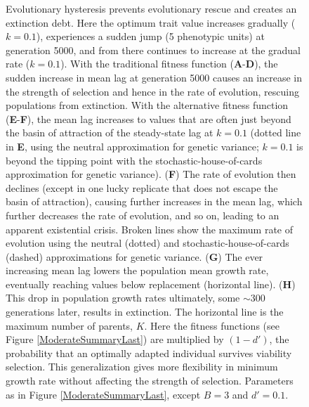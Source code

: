 \documentclass[12pt,letterpaper]{article} %
\begin{document}
\begin{figure}[!ht]
\centering
\caption{
Evolutionary hysteresis prevents evolutionary rescue and creates an extinction debt.
Here the optimum trait value increases gradually ($k=0.1$), experiences a sudden jump (5 phenotypic units) at generation 5000, and from there continues to increase at the gradual rate ($k=0.1$).  
With the traditional fitness function (\textbf{A}-\textbf{D}), the sudden increase in mean lag at generation 5000 causes an increase in the strength of selection and hence in the rate of evolution, rescuing populations from extinction.
With the alternative fitness function (\textbf{E}-\textbf{F}), the mean lag increases to values that are often just beyond the basin of attraction of the steady-state lag at $k=0.1$ (dotted line in \textbf{E}, using the neutral approximation for genetic variance; $k=0.1$ is beyond the tipping point with the stochastic-house-of-cards approximation for genetic variance).
(\textbf{F}) The rate of evolution then declines (except in one lucky replicate that does not escape the basin of attraction), causing further increases in the mean lag, which further decreases the rate of evolution, and so on, leading to an apparent existential crisis.
Broken lines show the maximum rate of evolution using the neutral (dotted) and stochastic-house-of-cards (dashed) approximations for genetic variance.
(\textbf{G}) The ever increasing mean lag lowers the population mean growth rate, eventually reaching values below replacement (horizontal line).
(\textbf{H}) This drop in population growth rates ultimately, some $\sim$300 generations later, results in extinction.
The horizontal line is the maximum number of parents, $K$.
Here the fitness functions (see Figure \ref{ModerateSummaryLast}) are multiplied by $(1-d')$, the probability that an optimally adapted individual survives viability selection.
This generalization gives more flexibility in minimum growth rate without affecting the strength of selection.
Parameters as in Figure \ref{ModerateSummaryLast}, except $B=3$ and $d'=0.1$.
}
\label{HysteresisSnapshot}
\end{figure}
\end{document}
